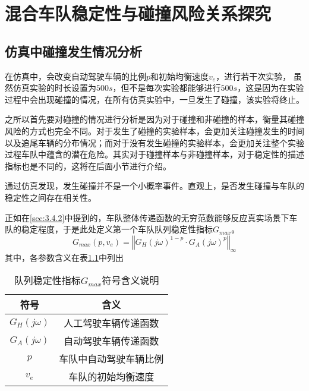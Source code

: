 
\chapter{混合车队稳定性与碰撞风险关系探究}

\section{仿真中碰撞发生情况分析}
\label{sec:4.1}

在仿真中，会改变自动驾驶车辆的比例$p$和初始均衡速度$v_e$，进行若干次实验， 虽然仿真实验的时长设置为$500s$，但不是每次实验都能够进行$500s$，这是因为在实验过程中会出现碰撞的情况，在所有仿真实验中，一旦发生了碰撞，该实验将终止。

之所以首先要对碰撞的情况进行分析是因为对于碰撞和非碰撞的样本，衡量其碰撞风险的方式也完全不同。对于发生了碰撞的实验样本，会更加关注碰撞发生的时间以及追尾车辆的分布情况；而对于没有发生碰撞的实验样本，会更加关注整个实验过程车队中蕴含的潜在危险。其实对于碰撞样本与非碰撞样本，对于稳定性的描述指标也是不同的，这将在后面小节进行介绍。

通过仿真发现，发生碰撞并不是一个小概率事件。直观上，是否发生碰撞与车队的稳定性之间存在相关性。

正如在\ref{sec:3.4.2}中提到的，车队整体传递函数的无穷范数能够反应真实场景下车队的稳定程度，于是此处定义第一个车队队列稳定性指标$G_{max}$。
\begin{equation}
    G_{max}(p, v_e) = \left\Vert G_H(j\omega)^{1-p} \cdot G_A(j\omega)^p \right\Vert_{\infty}
    \label{eq:chap04-1}
\end{equation}
其中，各参数含义在表\ref{tab:chap04-1}中列出

\begin{table}
    \centering
    \caption{队列稳定性指标$G_{max}$符号含义说明}
    \begin{tabular}{cc}
      \toprule
      符号          &  含义                         \\
      \midrule
      $G_H(j\omega)$    & 人工驾驶车辆传递函数        \\
      $G_A(j\omega)$    & 自动驾驶车辆传递函数         \\
      $p$               & 车队中自动驾驶车辆比例       \\
      $v_e$             & 车队的初始均衡速度          \\
      \bottomrule
    \end{tabular}
    \label{tab:chap04-1}
  \end{table}

